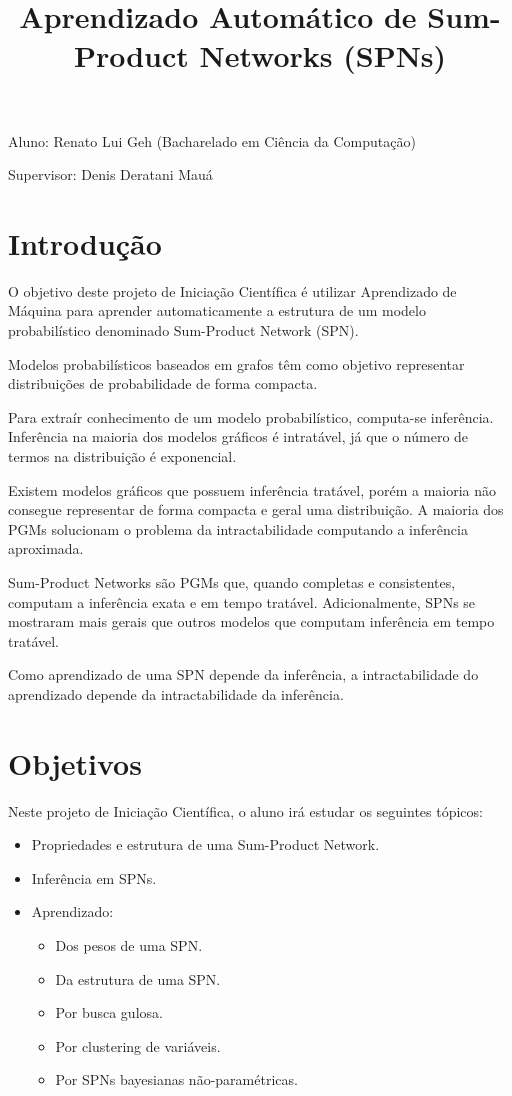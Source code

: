 \documentclass[a4paper,10pt]{article}
\title{\textbf{Aprendizado Automático de Sum-Product Networks (SPNs)}}
\theoremstyle{plain}
\begin{document}
\date{}
\author{}
\vspace*{-40pt}
{\let\newpage\relax\maketitle}

Aluno: Renato Lui Geh (Bacharelado em Ciência da Computação)

Supervisor: Denis Deratani Mauá

\section{Introdução}

O objetivo deste projeto de Iniciação Científica é utilizar Aprendizado de Máquina para aprender
automaticamente a estrutura de um modelo probabilístico denominado Sum-Product Network (SPN).

Modelos probabilísticos baseados em grafos têm como objetivo representar distribuições de
probabilidade de forma compacta.

Para extraír conhecimento de um modelo probabilístico, computa-se inferência. Inferência na
maioria dos modelos gráficos é intratável, já que o número de termos na distribuição é exponencial.

Existem modelos gráficos que possuem inferência tratável, porém a maioria não consegue representar
de forma compacta e geral uma distribuição. A maioria dos PGMs solucionam o problema da
intractabilidade computando a inferência aproximada.

Sum-Product Networks são PGMs que, quando completas e consistentes, computam a inferência exata e
em tempo tratável. Adicionalmente, SPNs se mostraram mais gerais que outros modelos que computam
inferência em tempo tratável.\cite{poon-domingos}

Como aprendizado de uma SPN depende da inferência, a intractabilidade do aprendizado depende da
intractabilidade da inferência.

\section{Objetivos}

Neste projeto de Iniciação Científica, o aluno irá estudar os seguintes tópicos:

\begin{itemize}
  \item Propriedades e estrutura de uma Sum-Product Network.
  \item Inferência em SPNs.
  \item Aprendizado:
  \begin{itemize}
    \item Dos pesos de uma SPN.\cite{poon-domingos}
    \item Da estrutura de uma SPN.\cite{gens-domingos}
    \item Por busca gulosa.\cite{greedy-search}
    \item Por clustering de variáveis.\cite{clustering}
    \item Por SPNs bayesianas não-paramétricas.\cite{non-parametric-bayesian}
  \end{itemize}
\end{itemize}
\end{document}
